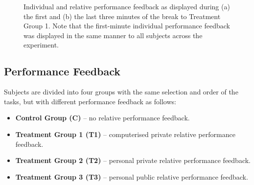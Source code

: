\documentclass[a4paper,11pt,oneside]{article}
\begin{document}
\begin{figure}[hbt]
  \begin{center}
    
    \caption{Individual and relative performance feedback as displayed during (a) the first and (b) the last three minutes of the break to Treatment Group 1. Note that the first-minute individual performance feedback was displayed in the same manner to all subjects across the experiment.}
    
  \end{center} 
  \label{fig:score-and-rank}
  \end{figure}
  

\subsection{Performance Feedback}
Subjects are divided into four groups with the same selection and order of the tasks, but with different performance feedback as follows:
\begin{itemize}
	\item {\bfseries Control Group (C)} -- no relative performance feedback.
	\item {\bfseries Treatment Group 1 (T1)} -- computerised private relative performance feedback.
	\item {\bfseries Treatment Group 2 (T2)} -- personal private relative performance feedback.
	\item {\bfseries Treatment Group 3 (T3)} -- personal public relative performance feedback.
\end{itemize}
\end{document}
